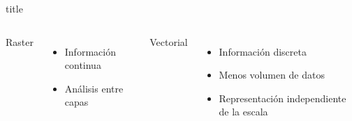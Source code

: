 \documentclass{beamer}
\begin{document}
\begin{frame}{title}
	\begin{columns}[t]
		Raster
		\begin{itemize}
			\item Información continua
			\item Análisis entre capas
		\end{itemize}
		Vectorial
		\begin{itemize}
			\item Información discreta
			\item Menos volumen de datos
			\item Representación independiente de la escala
		\end{itemize}
	\end{columns}
\end{frame}
\end{document}
